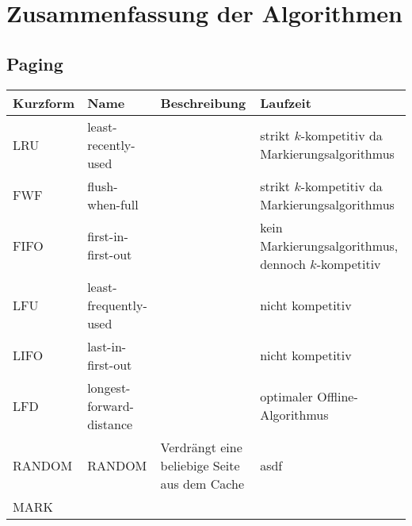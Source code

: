 \chapter{Zusammenfassung der Algorithmen}

\section{Paging}
\begin{tabularx}{\textwidth}{|l|X|X|X|} \hline
Kurzform & Name & Beschreibung & Laufzeit\\ \hline \hline
LRU  & least-recently-used      & & strikt $k$-kompetitiv da Markierungsalgorithmus \\ \hline
FWF  & flush-when-full          & & strikt $k$-kompetitiv da Markierungsalgorithmus \\ \hline
FIFO & first-in-first-out       & & kein Markierungsalgorithmus, dennoch $k$-kompetitiv \\ \hline
LFU  & least-frequently-used    & & nicht kompetitiv\\ \hline
LIFO & last-in-first-out        & & nicht kompetitiv\\ \hline
LFD  & longest-forward-distance & & optimaler Offline-Algorithmus \\ \hline
RANDOM & RANDOM & Verdrängt eine beliebige Seite aus dem Cache & asdf\\ \hline
MARK & & & \\ \hline
\end{tabularx}

